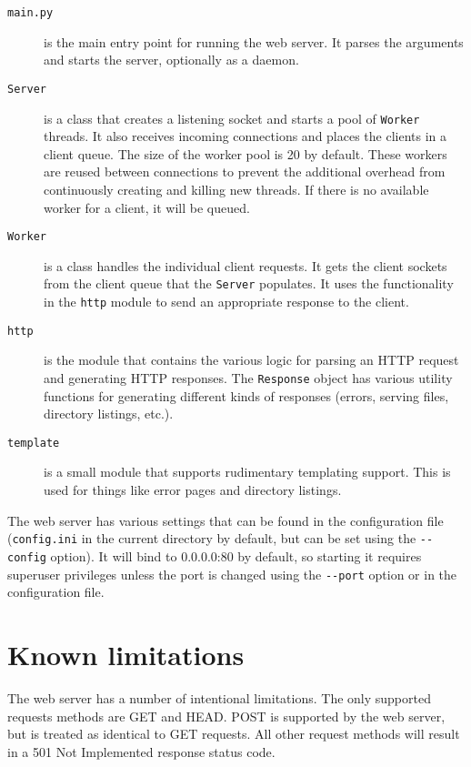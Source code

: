 \documentclass{sig-alternate}
\begin{document}
\begin{description}
    \item[\texttt{main.py}] is the main entry point for running the web
        server. It parses the arguments and starts the server, optionally as a
        daemon.
    \item[\texttt{Server}] is a class that creates a listening socket
        and starts a pool of \texttt{Worker} threads. It also receives
        incoming connections and places the clients in a client queue. The
        size of the worker pool is 20 by default. These workers are reused
        between connections to prevent the additional overhead from
        continuously creating and killing new threads. If there is no
        available worker for a client, it will be queued.
    \item[\texttt{Worker}] is a class handles the individual client requests.
        It gets the client sockets from the client queue that the
        \texttt{Server} populates. It uses the functionality in the
        \texttt{http} module to send an appropriate response to the client.
    \item[\texttt{http}] is the module that contains the various logic for
        parsing an HTTP request and generating HTTP responses. The
        \texttt{Response} object has various utility functions for generating
        different kinds of responses (errors, serving files, directory
        listings, etc.).
    \item[\texttt{template}] is a small module that supports rudimentary
        templating support. This is used for things like error pages and
        directory listings.
\end{description}

The web server has various settings that can be found in the configuration
file (\verb+config.ini+ in the current directory by default, but can be set
using the \verb+--config+ option). It will bind to 0.0.0.0:80 by default, so
starting it requires superuser privileges unless the port is changed using the
\verb+--port+ option or in the configuration file.


\section{Known limitations}
\label{sec:limitations}

The web server has a number of intentional limitations. The only supported
requests methods are GET and HEAD. POST is supported by the web server, but
is treated as identical to GET requests. All other request methods will
result in a 501 Not Implemented response status code.
\end{document}
